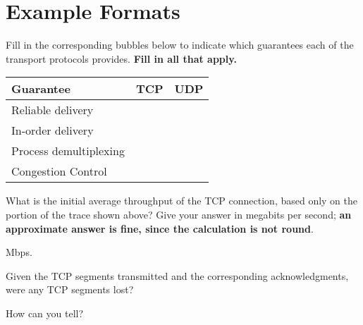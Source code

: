 \section{Example Formats}

Fill in the corresponding bubbles below to indicate which guarantees each of
the
transport protocols provides. {\bf Fill in all that apply.}

\begin{center}
    \begin{tabular}{lcc}
        Guarantee & TCP & UDP \\ \hline
        Reliable delivery &  \correctanswercircle{} & \answercircle{} \\ 
        In-order delivery &  \correctanswercircle{} & \answercircle{} \\ 
        Process demultiplexing & \correctanswercircle{} &
        \correctanswercircle{} \\ 
        Congestion Control &  \correctanswercircle{} & \answercircle{} \\ 
    \end{tabular}
\end{center}
\eprob

What is the initial average throughput of the TCP connection, based only
on the portion of the trace shown above? Give your answer in megabits per
second; {\bf an approximate answer is fine, since the calculation is not
round}. 

\begin{center}
     Mbps.
\end{center}
\eprob

Given the TCP segments transmitted and the corresponding
acknowledgments, were any TCP segments lost?

\hspace*{3in} \yesnono

How can you tell? \\
\eprob
